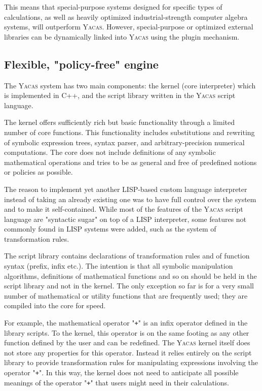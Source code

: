 \documentclass{llncs}
\begin{document}
This means that special-purpose systems designed for specific types of
calculations, as well as heavily optimized industrial-strength computer algebra
systems, will outperform \textsc{Yacas}. However, special-purpose or optimized external
libraries can be dynamically linked into \textsc{Yacas} using the plugin mechanism.


\subsection*{Flexible, "policy-free" engine}
The \textsc{Yacas} system has two main components: the kernel (core interpreter) which
is implemented in C++, and the script library written  in the \textsc{Yacas} script
language.


The kernel offers sufficiently rich but basic
functionality through a limited number of core functions. This functionality
includes substitutions and rewriting of symbolic expression trees,
syntax parser, and arbitrary-precision numerical computations. The core does
not include definitions of any symbolic mathematical operations and tries to be
as general and free of predefined notions or policies as possible.


The reason to implement yet another LISP-based custom language interpreter
instead of taking an already existing one was to have full control over the
system and to make it self-contained.
While most of the features of the \textsc{Yacas} script language are "syntactic sugar" on top of a LISP 
interpreter, some features not commonly found in LISP systems were  added, such
as the system of transformation rules.


The script library contains declarations of transformation rules and of function
syntax (prefix, infix etc.). The intention is that all symbolic manipulation algorithms, definitions
of mathematical functions and so on should be held in the script library and not in the kernel. The
only exception so far is for a very small number of mathematical or utility
functions that are frequently used; they are compiled into the core for speed.


For example, the mathematical operator "\texttt{+}" is an infix operator defined in the
library scripts. To the kernel, this operator is on the same footing as any
other function defined by the user and can be redefined. The \textsc{Yacas} kernel
itself does not store any properties for this operator. Instead it relies
entirely on the script library to provide transformation rules for manipulating
expressions involving the operator "\texttt{+}". In this way, the kernel does not need
to anticipate all possible meanings of the operator "\texttt{+}" that users might need
in their calculations.
\end{document}
